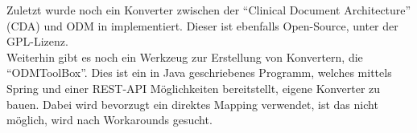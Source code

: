 Zuletzt wurde noch ein Konverter zwischen der \enquote{Clinical Document Architecture} (CDA) und ODM in  implementiert\cite{odm2cda}.
Dieser ist ebenfalls Open-Source, unter der GPL-Lizenz.\\

Weiterhin gibt es noch ein Werkzeug zur Erstellung von Konvertern, die \enquote{ODMToolBox}\cite{odmtoolbox}.
Dies ist ein in Java geschriebenes Programm, welches mittels Spring und einer REST-API Möglichkeiten bereitstellt, eigene Konverter zu bauen.
Dabei wird bevorzugt ein direktes Mapping verwendet, ist das nicht möglich, wird nach Workarounds gesucht.
